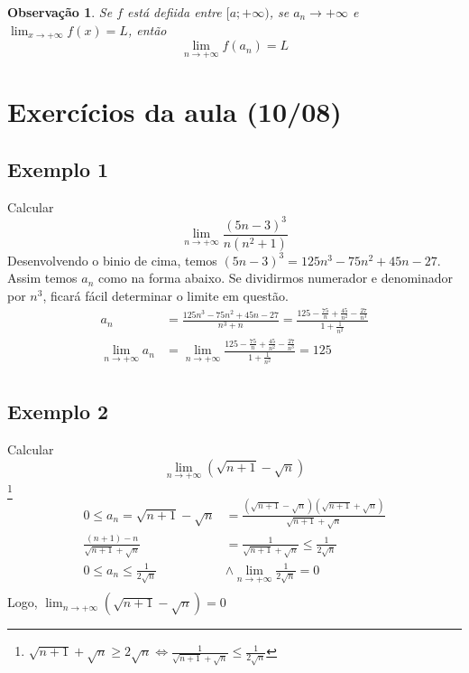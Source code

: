 \documentclass[12pt,openany]{book}
\newtheorem{obs}{Observação}
\begin{document}
\begin{obs} Se $f$ está defiida entre $[a;+\infty)$, se $a_n \rightarrow +\infty$ e $\displaystyle{\lim_{x \rightarrow +\infty} f(x) =L}$, então $$\lim_{n \rightarrow +\infty} f(a_n) =L$$
\end{obs}

\section{Exercícios da aula (10/08)}
\label{sec:s22}

\subsection*{Exemplo 1}
\label{subsec:ex221}
\hspace{5mm}Calcular $$\lim_{n \rightarrow +\infty} \frac{(5n-3)^3}{n(n^2+1)}$$
Desenvolvendo o binio de cima, temos $(5n-3)^3 = 125n^3-75n^2+45n -27$. Assim temos $a_n$ como na forma abaixo. Se dividirmos numerador e denominador por $n^3$, ficará fácil determinar o limite em questão.
\begin{align*}
a_n &= \frac{125n^3-75n^2+45n -27}{n^3+n} =  \frac{125 - \frac{75}{n} + \frac{45}{n^2} - \frac{27}{n^3}}{1 + \frac{1}{n^2}} \\
\lim_{n \rightarrow + \infty} a_n &= \lim_{n \rightarrow + \infty} \frac{125 - \frac{75}{n} + \frac{45}{n^2} - \frac{27}{n^3}}{1 + \frac{1}{n^2}} = 125\\
\end{align*}

\subsection*{Exemplo 2}
\label{subsec:ex222}
\hspace{5mm}Calcular $$\lim_{n \rightarrow +\infty} (\sqrt{n+1} - \sqrt{n})$$
\footnote{$\sqrt{n+1} + \sqrt{n} \geq 2\sqrt{n} \Longleftrightarrow \frac{1}{\sqrt{n+1} + \sqrt{n}} \leq \frac{1}{2\sqrt{n}} $}
\begin{align*}
0 \leq a_n = \sqrt{n+1} - \sqrt{n} &= \frac{(\sqrt{n+1} - \sqrt{n})(\sqrt{n+1} + \sqrt{n})}{\sqrt{n+1} + \sqrt{n}} \\
\frac{(n+1) - n}{\sqrt{n+1} + \sqrt{n}} &= \frac{1}{\sqrt{n+1} + \sqrt{n}} \leq \frac{1}{2\sqrt{n}}\\
0 \leq a_n \leq \frac{1}{2\sqrt{n}} & \land \lim_{n \rightarrow +\infty}\frac{1}{2\sqrt{n}} = 0  \\
\end{align*}
\hspace{5mm} Logo, $\displaystyle{\lim_{n \rightarrow +\infty} (\sqrt{n+1} - \sqrt{n}) = 0}$
\end{document}

